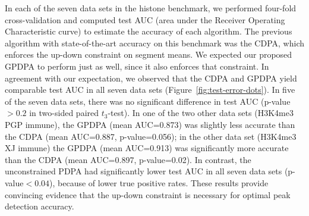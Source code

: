 \documentclass[twoside,11pt]{article}
\begin{document}
In each of the seven data sets in the histone benchmark,
we performed four-fold cross-validation and computed test AUC (area
under the Receiver Operating Characteristic curve) to estimate the
accuracy of each algorithm. The previous algorithm with
state-of-the-art accuracy on this benchmark was the CDPA, which
enforces the up-down constraint on segment means. We expected our
proposed GPDPA to perform just as well, since it also enforces that
constraint. In agreement with our expectation, we observed that the
CDPA and GPDPA yield comparable test AUC in all seven data sets
(Figure~\ref{fig:test-error-dots}). 
In five of the seven data sets,
there was no significant difference in test AUC (p-value$>0.2$ in
two-sided paired $t_3$-test). In one of the two other data sets
(H3K4me3 PGP immune), the GPDPA (mean AUC=0.873) was slightly less
accurate than the CDPA (mean AUC=0.887, p-value=0.056); in the other
data set (H3K4me3 XJ immune) the GPDPA (mean AUC=0.913) was significantly
more accurate than the CDPA (mean AUC=0.897, p-value=0.02). In contrast, the
unconstrained PDPA had significantly lower test AUC in all seven data sets
(p-value$<0.04$), because of lower true positive rates. These results
provide convincing evidence that the up-down constraint is necessary for
optimal peak detection accuracy.
\end{document}
